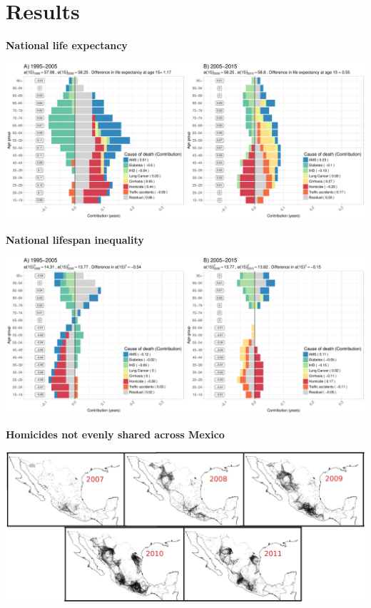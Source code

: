 \documentclass[xcolor={dvipsnames}]{beamer}
\begin{document}
\section{Results}

\begin{frame}
\begin{center}
\Large{\textbf{National life expectancy}}
\end{center}

\hspace*{-1cm}   
\includegraphics[scale=.31]{Figures/Figure_1}

\end{frame}


\begin{frame}
\begin{center}
\Large{\textbf{National lifespan inequality}}
\end{center}

\hspace*{-1cm}   
\includegraphics[scale=.31]{Figures/Figure_2}

\end{frame}

\begin{frame}
\begin{center}
\Large{\textbf{Homicides not evenly shared across Mexico}}
\end{center}

\hspace*{-1cm}   
\includegraphics[scale=.78]{Figures/map1}

\end{frame}
\end{document}
